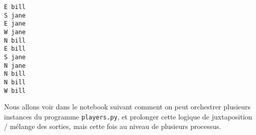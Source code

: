     \begin{Verbatim}[commandchars=\\\{\},frame=single,framerule=0.3mm,rulecolor=\color{cellframecolor}]
E bill
S jane
E jane
W jane
N bill
E bill
S jane
N jane
N bill
N bill
W bill
\end{Verbatim}

    Nous allons voir dans le notebook suivant comment on peut orchestrer
plusieurs instances du programme \texttt{players.py}, et prolonger cette
logique de juxtaposition / mélange des sorties, mais cette fois au
niveau de plusieurs processus.


    
    
    
